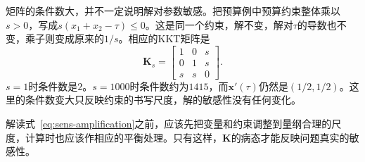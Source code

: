 矩阵的条件数大，并不一定说明解对参数敏感。把预算例中预算约束整体乘以$s>0$，写成$s(x_1+x_2-\tau)\leq0$。这是同一个约束，解不变，解对$\tau$的导数也不变，乘子则变成原来的$1/s$。相应的KKT矩阵是
\[
 \bm{K}_s=\begin{bmatrix}1&0&s\\0&1&s\\s&s&0\end{bmatrix}.
\]
$s=1$时条件数是$2$。$s=1000$时条件数约为$1415$，而$\bm{x}'(\tau)$仍然是$(1/2,1/2)$。这里的条件数变大只反映约束的书写尺度，解的敏感性没有任何变化。

解读式~\eqref{eq:sens-amplification}之前，应该先把变量和约束调整到量纲合理的尺度，计算时也应该作相应的平衡处理。只有这样，$\bm{K}$的病态才能反映问题真实的敏感性。
